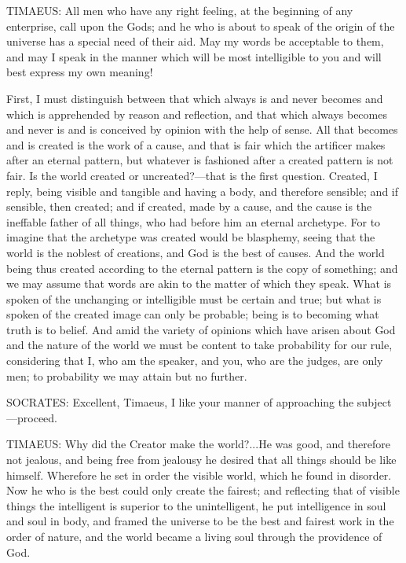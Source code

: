 TIMAEUS: All men who have any right feeling, at the beginning of any
enterprise, call upon the Gods; and he who is about to speak of the origin
of the universe has a special need of their aid. May my words be
acceptable to them, and may I speak in the manner which will be most
intelligible to you and will best express my own meaning!

First, I must distinguish between that which always is and never becomes
and which is apprehended by reason and reflection, and that which always
becomes and never is and is conceived by opinion with the help of sense.
All that becomes and is created is the work of a cause, and that is fair
which the artificer makes after an eternal pattern, but whatever is
fashioned after a created pattern is not fair. Is the world created or
uncreated?—that is the first question. Created, I reply, being
visible and tangible and having a body, and therefore sensible; and if
sensible, then created; and if created, made by a cause, and the cause is
the ineffable father of all things, who had before him an eternal
archetype. For to imagine that the archetype was created would be
blasphemy, seeing that the world is the noblest of creations, and God is
the best of causes. And the world being thus created according to the
eternal pattern is the copy of something; and we may assume that words are
akin to the matter of which they speak. What is spoken of the unchanging
or intelligible must be certain and true; but what is spoken of the
created image can only be probable; being is to becoming what truth is to
belief. And amid the variety of opinions which have arisen about God and
the nature of the world we must be content to take probability for our
rule, considering that I, who am the speaker, and you, who are the judges,
are only men; to probability we may attain but no further.

SOCRATES: Excellent, Timaeus, I like your manner of approaching the
subject—proceed.

TIMAEUS: Why did the Creator make the world?...He was good, and therefore
not jealous, and being free from jealousy he desired that all things
should be like himself. Wherefore he set in order the visible world, which
he found in disorder. Now he who is the best could only create the
fairest; and reflecting that of visible things the intelligent is superior
to the unintelligent, he put intelligence in soul and soul in body, and
framed the universe to be the best and fairest work in the order of
nature, and the world became a living soul through the providence of God.

